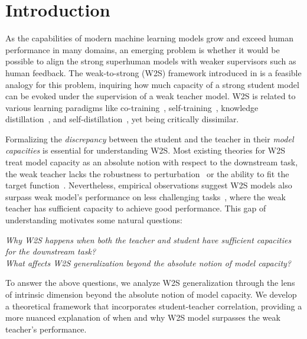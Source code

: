 \section{Introduction}
As the capabilities of modern machine learning models grow and exceed human performance in many domains, an emerging problem is whether it would be possible to align the strong superhuman models with weaker supervisors such as human feedback. The weak-to-strong (W2S) framework introduced in \cite{burns2023weak} is a feasible analogy for this problem, inquiring how much capacity of a strong student model can be evoked under the supervision of a weak teacher model.
W2S is related to various learning paradigms like co-training~\citep{blum1998combining}, self-training~\citep{scudder1965probability}, knowledge distillation~\citep{hinton2015distilling}, and self-distillation~\citep{zhang2019your,zhang2021self}, yet being critically dissimilar. 

Formalizing the \emph{discrepancy} between the student and the teacher in their \emph{model capacities} is essential for understanding W2S. 
Most existing theories for W2S treat model capacity as an absolute notion with respect to the downstream task, \eg the weak teacher lacks the robustness to perturbation~\citep{lang2024theoretical,shin2024weak} or the ability to fit the target function~\citep{ildiz2024high,wu2024provable}. 
Nevertheless, empirical observations suggest W2S models also surpass weak model's performance on less challenging tasks~\citep{burns2023weak}, where the weak teacher has sufficient capacity to achieve good performance.
This gap of understanding motivates some natural questions:
\begin{center}
    \emph{Why W2S happens when both the teacher and student have sufficient capacities for the downstream task? \\
    What affects W2S generalization beyond the absolute notion of model capacity?}
\end{center}
To answer the above questions, we analyze W2S generalization through the lens of intrinsic dimension beyond the absolute notion of model capacity. We develop a theoretical framework that incorporates student-teacher correlation, providing a more nuanced explanation of when and why W2S model surpasses the weak teacher's performance.  

